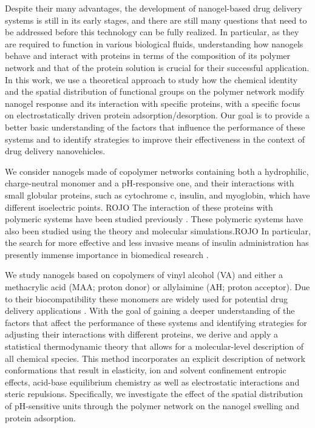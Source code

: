 Despite their many advantages, the development of nanogel-based drug delivery systems is still in its early stages, and there are still many questions that need to be addressed before this technology can be fully realized.
In particular, as they are required to function in various biological fluids, understanding how nanogels behave and interact with proteins in terms of the composition of its polymer network and that of the  protein solution is crucial for their successful application.
In this work, we use a theoretical approach to study how the chemical identity and the spatial distribution of functional groups on the polymer network modify nanogel response and its interaction with specific proteins, with a specific focus on electrostatically driven protein adsorption/desorption.
Our goal is to provide a better basic understanding of the factors that influence the performance of these systems and to identify strategies to improve their effectiveness in the context of drug delivery nanovehicles.






We consider nanogels made of copolymer networks containing both a hydrophilic, charge-neutral monomer and a pH-responsive one, and their interactions with small globular proteins, such as cytochrome c, insulin, and myoglobin, which have different isoelectric points.
ROJO
The interaction of these proteins with polymeric systems have been studied previously .
These polymeric systems have also been studied using the theory and molecular simulations.
ROJO
In particular, the search for more effective and less invasive means of insulin administration has presently immense importance in biomedical research .




We study nanogels based on copolymers of vinyl alcohol (VA) and either a methacrylic acid (MAA; proton donor) or allylaimine (AH; proton acceptor).
Due to their biocompatibility these monomers are widely used for potential drug delivery applications .
With the goal of gaining a deeper understanding of the factors that affect the performance of these systems and identifying strategies for adjusting their interactions with different proteins, we derive and apply a statistical thermodynamic theory that allows for a molecular-level description of all chemical species.
This method incorporates an explicit description of network conformations that result in elasticity, ion and solvent confinement entropic effects, acid-base equilibrium chemistry as well as electrostatic interactions and steric repulsions.
Specifically, we investigate the effect of the spatial distribution of pH-sensitive units through the polymer network on the nanogel swelling and protein adsorption.


